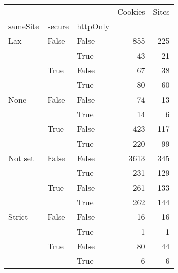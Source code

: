 \begin{tabular}{lllrr}
\toprule
       &      &      &  Cookies &  Sites \\
sameSite & secure & httpOnly &          &        \\
\midrule
Lax & False & False &      855 &    225 \\
       &      & True &       43 &     21 \\
       & True & False &       67 &     38 \\
       &      & True &       80 &     60 \\
None & False & False &       74 &     13 \\
       &      & True &       14 &      6 \\
       & True & False &      423 &    117 \\
       &      & True &      220 &     99 \\
Not set & False & False &     3613 &    345 \\
       &      & True &      231 &    129 \\
       & True & False &      261 &    133 \\
       &      & True &      262 &    144 \\
Strict & False & False &       16 &     16 \\
       &      & True &        1 &      1 \\
       & True & False &       80 &     44 \\
       &      & True &        6 &      6 \\
\bottomrule
\end{tabular}
